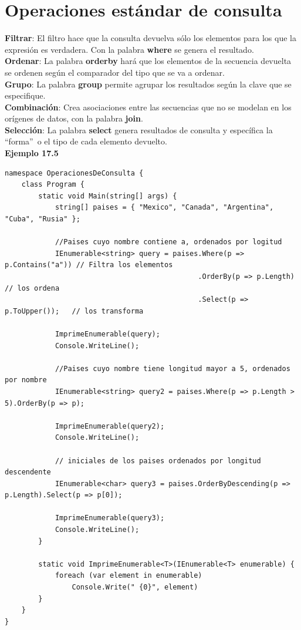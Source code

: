 \documentclass[12pt,a4paper]{report}
\begin{document}
\section{Operaciones estándar de consulta}
\textbf{Filtrar}: El filtro hace que la consulta devuelva sólo los elementos para los que la expresión es verdadera. Con la palabra\textbf{ where} se genera el resultado.\\\textbf{Ordenar}: La palabra\textbf{ orderby} hará que los elementos de la secuencia devuelta se ordenen según el comparador del tipo que se va a ordenar.\\\textbf{Grupo}: La palabra\textbf{ group} permite agrupar los resultados según la clave que se especifique.\\\textbf{Combinación}: Crea asociaciones entre las secuencias que no se modelan en los orígenes de datos, con la palabra\textbf{ join}.\\\textbf{Selección}: La palabra\textbf{ select} genera resultados de consulta y específica la ``forma”\ o el tipo de cada elemento devuelto.\\\textbf{Ejemplo 17.5}
\begin{lstlisting}
namespace OperacionesDeConsulta {
    class Program {
        static void Main(string[] args) {
            string[] paises = { "Mexico", "Canada", "Argentina", "Cuba", "Rusia" };

            //Paises cuyo nombre contiene a, ordenados por logitud
            IEnumerable<string> query = paises.Where(p => p.Contains("a")) // Filtra los elementos
                                              .OrderBy(p => p.Length)      // los ordena 
                                              .Select(p => p.ToUpper());   // los transforma

            ImprimeEnumerable(query);
            Console.WriteLine();

            //Paises cuyo nombre tiene longitud mayor a 5, ordenados por nombre
            IEnumerable<string> query2 = paises.Where(p => p.Length > 5).OrderBy(p => p);

            ImprimeEnumerable(query2);
            Console.WriteLine();

            // iniciales de los paises ordenados por longitud descendente
            IEnumerable<char> query3 = paises.OrderByDescending(p => p.Length).Select(p => p[0]);                

            ImprimeEnumerable(query3);
            Console.WriteLine();
        }

        static void ImprimeEnumerable<T>(IEnumerable<T> enumerable) {
            foreach (var element in enumerable)
                Console.Write(" {0}", element)
        }
    }
}
\end{lstlisting}
\end{document}
